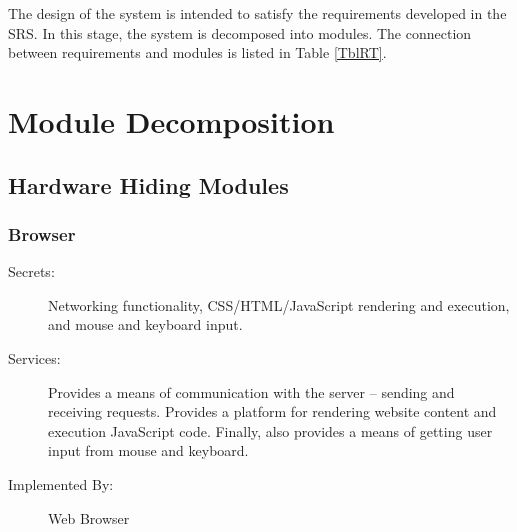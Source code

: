 \documentclass[12pt, titlepage]{article}
\begin{document}
The design of the system is intended to satisfy the requirements developed in
the SRS. In this stage, the system is decomposed into modules. The connection
between requirements and modules is listed in Table \ref{TblRT}.


\newpage
\section{Module Decomposition} \label{SecMD}


\subsection{Hardware Hiding Modules}

\subsubsection{Browser} \label{mdBrowser}
\begin{description}
\item[Secrets:] Networking functionality, CSS/HTML/JavaScript rendering and
    execution, and mouse and keyboard input.
\item[Services:] Provides a means of communication with the server -- sending
    and receiving requests. Provides a platform for rendering website
    content and execution JavaScript code. Finally, also provides a means of
    getting user input from mouse and keyboard.
\item[Implemented By:] Web Browser
\end{description}
\end{document}
